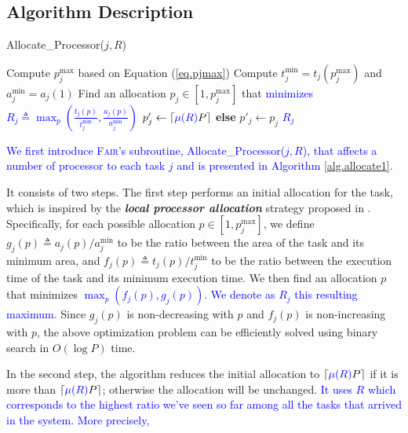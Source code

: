 \documentclass{article}
\newcommand\fair{\textsc{Fair}\xspace}
\newcommand\ratio{R\xspace}
\newcommand{\new}[1]{\textcolor{blue}{#1}}
\newcommand{\neww}[1]{\textcolor{blue}{#1}}
\begin{document}
\subsection{Algorithm Description}

{
\begin{algorithm}[t]
    \footnotesize
	\caption{Allocate\_Processor($j,\ratio$)}\label{alg.allocate1}
    \KwIn{\neww{Task $j$ and Ratio $\ratio$ }}
    \KwOut{\neww{Processor allocation $p'_j$ for the task}}
    Compute $p_j^{\max}$ based on Equation (\ref{eq.pjmax})\;
    Compute $t_j^{\min} = t_j(p_j^{\max})$ and $a_j^{\min} = a_j(1)$\;
    Find an allocation $p_j \in [1, p_j^{\max}]$ that \new{minimizes $\ratio_j \triangleq \max_p\left(\frac{t_j(p)}{t_j^{\min}}, \frac{a_j(p)}{a_j^{\min}}\right)$}\;
    \lIf{$p_j > \lceil \new{\mu(R)} P \rceil$}
    {
        $p'_j \leftarrow \lceil \new{\mu(R)} P \rceil$ \textbf{else} $p'_j \leftarrow p_j$
    }
   \new{\Return $\ratio_j$\;}
\end{algorithm}
}

\new{We first introduce \fair's subroutine, Allocate\_Processor($j,\ratio$), that affects a number of processor to each task $j$ and is presented in Algorithm \ref{alg.allocate1}.}

It consists of two steps. The first step performs an initial allocation for the task, which is inspired by the \textbf{\emph{local processor allocation}} strategy proposed in \cite{Benoit20_cluster, Benoit21_ieeetc}. Specifically, for each possible allocation $p\in [1, p_j^{\max}]$, we define $g_j(p) \triangleq a_j(p)/a_j^{\min}$ to be the ratio between the area of the task and its minimum area, and $f_j(p) \triangleq t_j(p)/t_j^{\min}$ to be the ratio between the execution time of the task and its minimum execution time. We then find an allocation $p$ that minimizes \new{$\max_p(f_j(p),g_j(p))$. We denote as $\ratio_j$ this resulting maximum.} Since $g_j(p)$ is non-decreasing with $p$ and $f_j(p)$ is non-increasing with $p$, the above optimization problem can be efficiently solved using binary search in $O(\log P)$ time.


In the second step, the algorithm reduces the initial allocation to $\lceil \new{\mu(\ratio)} P \rceil$ if it is more than $\lceil \new{\mu(\ratio)} P \rceil$; otherwise the allocation will be unchanged. \new{It uses $\ratio$ which corresponds to the highest ratio we've seen so far among all the tasks that arrived in the system. More precisely, }
\end{document}
